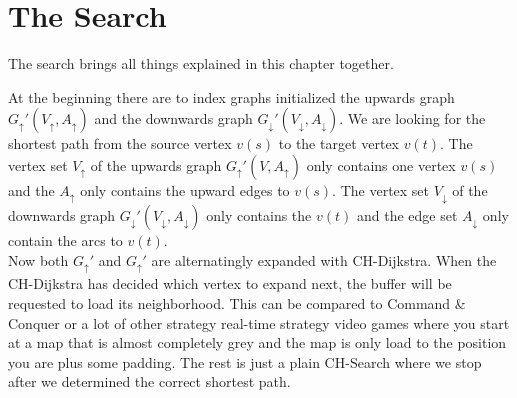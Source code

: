 \section{The Search}

The search brings all things explained in this chapter together. 

At the beginning there are to index graphs initialized the upwards graph $G_\uparrow'(V_\uparrow, A_\uparrow)$ and the downwards graph $G_\downarrow'(V_\downarrow, A_\downarrow)$. We are looking for the shortest
path from the source vertex $v(s)$ to the target vertex $v(t)$. The vertex set $V_\uparrow$ of the upwards graph $G_\uparrow'(V, A_\uparrow)$ only contains one vertex $v(s)$ and the $A_\uparrow$ only contains 
the upward edges to $v(s)$. The vertex set $V_\downarrow$ of the downwards graph $G_\downarrow'(V_\downarrow, A_\downarrow)$ only contains the $v(t)$ and the edge set $A_\downarrow$ only contain the arcs to $v(t)$.
\\
Now both $G_\uparrow'$ and $G_\uparrow'$ are alternatingly expanded with CH-Dijkstra. When the CH-Dijkstra has decided which vertex to expand next, the buffer will be requested to load its neighborhood. This can be 
compared to Command \& Conquer or a lot of other strategy  real-time strategy video games where you start at a map that is almost completely grey and the map is only load to the position you are plus some padding.
The rest is just a plain CH-Search where we stop after we determined the correct shortest path.

%    
